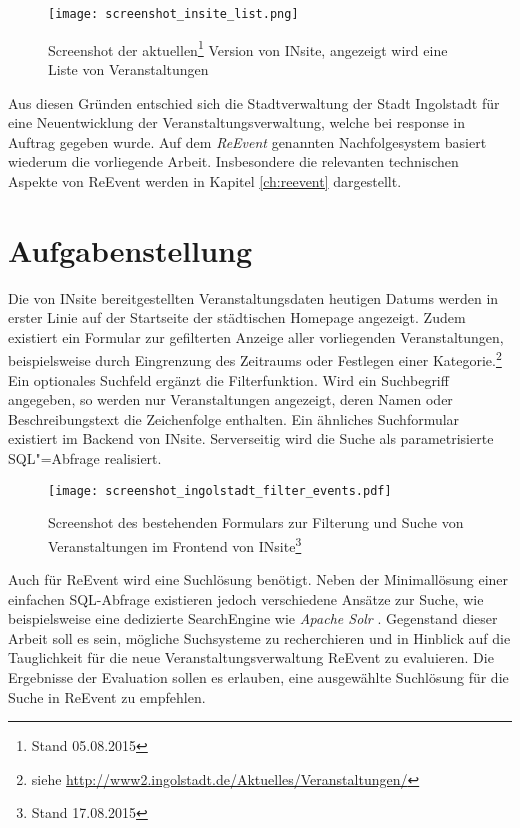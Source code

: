 \begin{figure}[ht]
	\begin{margincap}
		\raggedright
		\texttt{[image: screenshot\_insite\_list.png]}
		\caption[Screenshot von INsite]{Screenshot der aktuellen\footnote{Stand 05.08.2015} Version von INsite, angezeigt wird eine Liste von Veranstaltungen}
		\label{fig:insite_screenshot_list}
	\end{margincap}
\end{figure}

Aus diesen Gründen entschied sich die Stadtverwaltung der Stadt Ingolstadt für eine Neuentwicklung der Veranstaltungsverwaltung, welche bei response in Auftrag gegeben wurde. Auf dem \emph{ReEvent} genannten Nachfolgesystem basiert wiederum die vorliegende Arbeit. Insbesondere die relevanten technischen Aspekte von ReEvent werden in Kapitel \ref{ch:reevent} dargestellt.


\section{Aufgabenstellung}
\label{sec:task}

Die von INsite bereitgestellten Veranstaltungsdaten heutigen Datums werden in erster Linie auf der Startseite der städtischen Homepage angezeigt. Zudem existiert ein Formular zur gefilterten Anzeige aller vorliegenden Veranstaltungen, beispielsweise durch Eingrenzung des Zeitraums oder Festlegen einer Kategorie.\footnote{ siehe \url{http://www2.ingolstadt.de/Aktuelles/Veranstaltungen/}}
Ein optionales Suchfeld ergänzt die Filterfunktion. Wird ein Suchbegriff angegeben, so werden nur Veranstaltungen angezeigt, deren Namen oder Beschreibungstext die Zeichenfolge enthalten. Ein ähnliches Suchformular existiert im Backend von INsite. Serverseitig wird die Suche als parametrisierte SQL"=Abfrage realisiert.

\begin{figure}[ht]
	\begin{margincap}
		\raggedright
		\texttt{[image: screenshot\_ingolstadt\_filter\_events.pdf]}
		\caption[Screenshot des bestehenden Suchformulars]{Screenshot des bestehenden Formulars zur Filterung und Suche von Veranstaltungen im Frontend von INsite\footnote{Stand 17.08.2015}}
		\label{fig:insite_screenshot_filter_original}
	\end{margincap}
\end{figure}

Auch für ReEvent wird eine Suchlösung benötigt. Neben der Minimallösung einer einfachen SQL-Abfrage existieren jedoch verschiedene Ansätze zur Suche, wie beispielsweise eine dedizierte SearchEngine wie \emph{Apache Solr} \cite[S. 4]{Grainger.2014}. Gegenstand dieser Arbeit soll es sein, mögliche Suchsysteme zu recherchieren und in Hinblick auf die Tauglichkeit für die neue Veranstaltungsverwaltung ReEvent zu evaluieren. Die Ergebnisse der Evaluation sollen es erlauben, eine ausgewählte Suchlösung für die Suche in ReEvent zu empfehlen.


